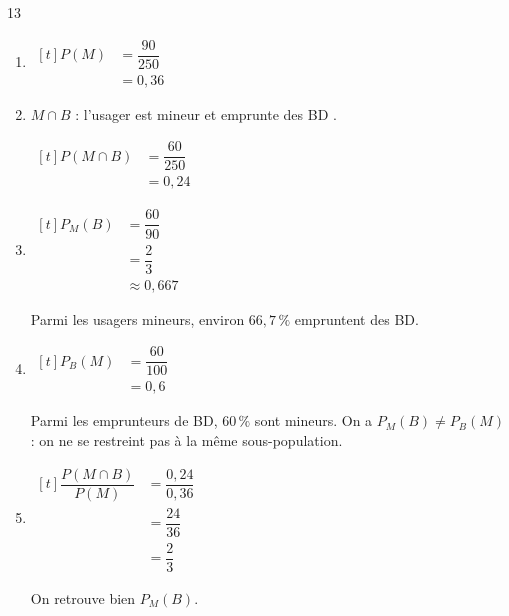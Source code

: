 \documentclass[10pt,a4paper]{article}
\begin{document}
\begin{corr}[Guidé]{13}
\begin{enumerate}[leftmargin=*]
    \item \(\begin{aligned}[t] P(M)&=\dfrac{90}{250}\\ &=0,36\end{aligned}\)
    \item \(M\cap B\) : \og l'usager est mineur et emprunte des BD \fg{}.

    \(\begin{aligned}[t] P(M\cap B)&=\dfrac{60}{250}\\ &=0,24\end{aligned}\)
    \item \(\begin{aligned}[t] P_M(B)&=\dfrac{60}{90}\\ &=\dfrac{2}{3}\\ &\approx 0,667\end{aligned}\)

    Parmi les usagers mineurs, environ \(66,7\,\%\) empruntent des BD.
    \item \(\begin{aligned}[t] P_B(M)&=\dfrac{60}{100}\\ &=0,6\end{aligned}\)

    Parmi les emprunteurs de BD, \(60\,\%\) sont mineurs. On a \(P_M(B)\neq P_B(M)\) : on ne se restreint pas à la même sous-population.
    \item \(\begin{aligned}[t] \dfrac{P(M\cap B)}{P(M)}&=\dfrac{0,24}{0,36}\\ &=\dfrac{24}{36}\\ &=\dfrac{2}{3}\end{aligned}\)

    On retrouve bien \(P_M(B)\).
\end{enumerate}
\end{corr}
\end{document}
